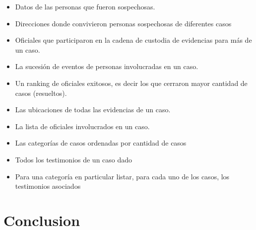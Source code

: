 \documentclass[10pt,a4paper]{article}
\begin{document}
\begin{itemize}
\item Datos de las personas que fueron sospechosas.
\item Direcciones donde convivieron personas sospechosas de diferentes casos
\item Oficiales que participaron en la cadena de custodia de evidencias para más de un
caso.
\item La sucesión de eventos de personas involucradas en un caso.
\item Un ranking de oficiales exitosos, es decir los que cerraron mayor cantidad de casos
(resueltos).
\item Las ubicaciones de todas las evidencias de un caso.
\item La lista de oficiales involucrados en un caso.
\item Las categorías de casos ordenadas por cantidad de casos
\item Todos los testimonios de un caso dado
\item Para una categoría en particular listar, para cada uno de los casos, los testimonios
asociados
\end{itemize}
\section{Conclusion}
\end{document}
